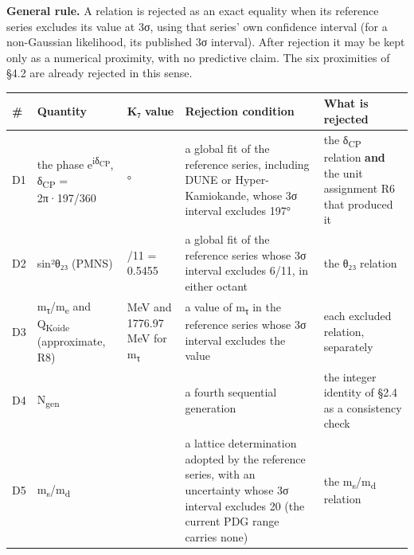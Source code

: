 \documentclass[11pt,a4paper]{article}
\begin{document}
\textbf{General rule.} A relation is rejected as an exact equality when its reference series excludes its value at 3σ, using that series' own confidence interval (for a non-Gaussian likelihood, its published 3σ interval). After rejection it may be kept only as a numerical proximity, with no predictive claim. The six proximities of §4.2 are already rejected in this sense.

{\footnotesize\setlength{\tabcolsep}{3pt}
\begin{longtable}[]{@{}
  >{\raggedright\arraybackslash}p{}
  >{\raggedright\arraybackslash}p{}
  >{\raggedright\arraybackslash}p{}
  >{\raggedright\arraybackslash}p{}
  >{\raggedright\arraybackslash}p{}@{}}
\toprule\noalign{}
\begin{minipage}[b]{\linewidth}\raggedright
\#
\end{minipage} & \begin{minipage}[b]{\linewidth}\raggedright
Quantity
\end{minipage} & \begin{minipage}[b]{\linewidth}\raggedright
K₇ value
\end{minipage} & \begin{minipage}[b]{\linewidth}\raggedright
Rejection condition
\end{minipage} & \begin{minipage}[b]{\linewidth}\raggedright
What is rejected
\end{minipage} \\
\midrule\noalign{}
\endhead
\bottomrule\noalign{}
\endlastfoot
D1 & the phase e\textsuperscript{iδ\textsubscript{CP}}, δ\textsubscript{CP} = 2π·197/360 & 197° & a global fit of the reference series, including DUNE or Hyper-Kamiokande, whose 3σ interval excludes 197° & the δ\textsubscript{CP} relation \textbf{and} the unit assignment R6 that produced it \\
D2 & sin²θ₂₃ (PMNS) & 6/11 = 0.5455 & a global fit of the reference series whose 3σ interval excludes 6/11, in either octant & the θ₂₃ relation \\
D3 & m\textsubscript{τ}/m\textsubscript{e} and Q\textsubscript{Koide} (approximate, R8) & 1776.74 MeV and 1776.97 MeV for m\textsubscript{τ} & a value of m\textsubscript{τ} in the reference series whose 3σ interval excludes the value & each excluded relation, separately \\
D4 & N\textsubscript{gen} & 3 & a fourth sequential generation & the integer identity of §2.4 as a consistency check \\
D5 & m\textsubscript{s}/m\textsubscript{d} & 20 & a lattice determination adopted by the reference series, with an uncertainty whose 3σ interval excludes 20 (the current PDG range carries none) & the m\textsubscript{s}/m\textsubscript{d} relation \\
\end{longtable}}
\end{document}
